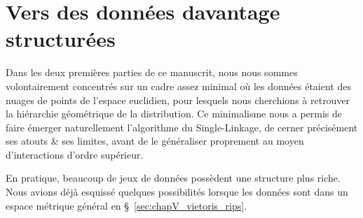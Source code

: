 \documentclass{these-ISSS} %
\begin{document}











\part{Vers des données davantage structurées}
Dans les deux premières parties de ce manuscrit, nous nous sommes volontairement concentrés sur un cadre assez minimal où les données étaient des nuages de points de l'espace euclidien, pour lesquels nous cherchions à retrouver la hiérarchie géométrique de la distribution.
Ce minimalisme nous a permis de faire émerger naturellement l'algorithme du Single-Linkage, de cerner précisément ses atouts \& ses limites, avant de le généraliser proprement au moyen d'interactions d'ordre supérieur.

En pratique, beaucoup de jeux de données possèdent une structure plus riche.
Nous avions déjà esquissé quelques possibilités lorsque les données sont dans un espace métrique général en \S~\ref{sec:chapV_vietoris_rips}.
\end{document}
